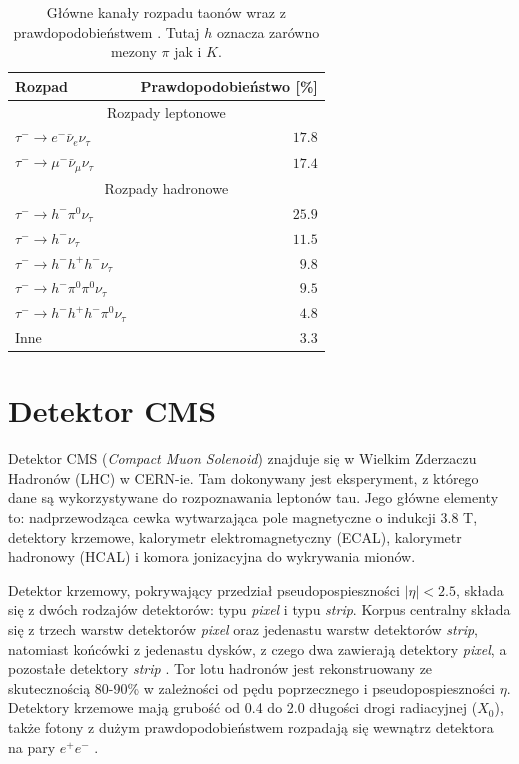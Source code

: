 \documentclass{pracalicmgr}
\begin{document}
	\begin{table}[H]
	\centering
	\begin{tabular}{lr}
	\toprule
	Rozpad & Prawdopodobieństwo [\%] \\
	\midrule
	\multicolumn{2}{c}{Rozpady leptonowe} \\
	\midrule
	$\tau^- \rightarrow e^-\bar{\nu}_{e}\nu_{\tau}$ & $17.8$ \\
	$\tau^- \rightarrow \mu^-\bar{\nu}_{\mu}\nu_{\tau}$ & $17.4$ \\
	\midrule
	\multicolumn{2}{c}{Rozpady hadronowe} \\
	\midrule
	$\tau^- \rightarrow h^- \pi^0 \nu_{\tau}$ & $25.9$ \\
	$\tau^- \rightarrow h^-\nu_{\tau}$ & $11.5$ \\
	$\tau^- \rightarrow h^- h^+ h^- \nu_{\tau}$ & $9.8$ \\
	$\tau^- \rightarrow h^- \pi^0 \pi^0 \nu_{\tau}$ & $9.5$ \\
	$\tau^- \rightarrow h^- h^+ h^- \pi^0 \nu_{\tau}$ & $4.8$ \\
	Inne & $3.3$ \\	
	\bottomrule
	\end{tabular}
	\caption{Główne kanały rozpadu taonów wraz z prawdopodobieństwem \cite{tauid13, particle_physics}. Tutaj $h$ oznacza zarówno mezony $\pi$ jak i $K$.}
	\label{tab:kanaly_rozpadu}
	\end{table}
        
    \section{Detektor CMS}
	Detektor CMS (\textit{Compact Muon Solenoid}) znajduje się w Wielkim Zderzaczu Hadronów (LHC) w CERN-ie. Tam dokonywany jest eksperyment, z którego dane są wykorzystywane do rozpoznawania leptonów tau. Jego główne elementy to: nadprzewodząca cewka wytwarzająca pole magnetyczne o indukcji 3.8 T, detektory krzemowe, kalorymetr elektromagnetyczny (ECAL), kalorymetr hadronowy (HCAL) i komora jonizacyjna do wykrywania mionów. 
	
	Detektor krzemowy, pokrywający przedział pseudopospieszności $|\eta| < 2.5$, składa się z dwóch rodzajów detektorów: typu \textit{pixel} i typu \textit{strip}. Korpus centralny składa się z trzech warstw detektorów \textit{pixel} oraz jedenastu warstw detektorów \textit{strip}, natomiast końcówki z jedenastu dysków, z czego dwa zawierają detektory \textit{pixel}, a pozostałe detektory \textit{strip} \cite{cms_technical}. Tor lotu hadronów jest rekonstruowany ze skutecznością 80-90\% w zależności od pędu poprzecznego i pseudopospieszności $\eta$. Detektory krzemowe mają grubość od 0.4 do 2.0 długości drogi radiacyjnej ($X_0$), także fotony z dużym prawdopodobieństwem rozpadają się wewnątrz detektora na pary $e^+e^-$ \cite{tauid13}.
	
\end{document}
